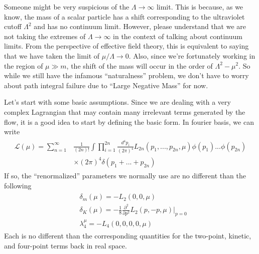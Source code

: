 \documentclass[12pt,halfline,a4paper]{ouparticle}
\begin{document}
Someone might be very suspicious of the $\Lambda\rightarrow\infty$ limit. This is because, as we know, the mass of a scalar particle has a shift corresponding to the ultraviolet cutoff $\Lambda^2$ and has no continuum limit.
However, please understand that we are not taking the extremes of $\Lambda\rightarrow\infty$ in the context of talking about continuum limits.
From the perspective of effective field theory, this is equivalent to saying that we have taken the limit of $\mu/\Lambda\rightarrow0$.
Also, since we're fortunately working in the region of $\mu\gg m$, the shift of the mass will occur in the order of $\Lambda^2-\mu^2$. So while we still have the infamous “naturalness” problem, we don't have to worry about path integral failure due to “Large Negative Mass” for now.


Let's start with some basic assumptions. Since we are dealing with a very complex Lagrangian that may contain many irrelevant terms generated by the flow, it is a good idea to start by defining the basic form. In fourier basis, we can write
\begin{align}
	\begin{split}
		\mathcal L(\mu) = \sum^\infty_{n=1}&\frac{1}{(2n)!}\int\prod^{2n}_{i=1}\frac{d^4p_i}{(2\pi)^4}L_{2n}(p_1,...,p_{2n},\mu)\phi(p_1)...\phi(p_{2n})\\
		&\times(2\pi)^4\delta(p_1+...+p_{2n})
	\end{split}
\end{align}
If so, the “renormalized” parameters we normally use are no different than the following
\begin{align}
	\begin{split}
		&\delta_m(\mu) = -L_2(0,0,\mu)\\
		&\delta_K(\mu) = -\frac{1}{8}\frac{\partial^2}{\partial p^2}L_2(p,-p,\mu)|_{p=0}\\
		&\lambda^\mu_4 = -L_4(0,0,0,0,\mu)
	\end{split}
\end{align}
Each is no different than the corresponding quantities for the two-point, kinetic, and four-point terms back in real space.
\end{document}
